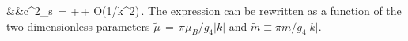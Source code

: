 \bea
&&c^2_{s} \,=\,\,+\,+ {O}(1/k^2)\,.
\eea
The expression can be rewritten as a function of the two dimensionless parameters $\tilde \mu\,=\,\pi \mu_B/g_4 |k|$ and 
$\tilde m\equiv \pi m/g_4 |k|$.
